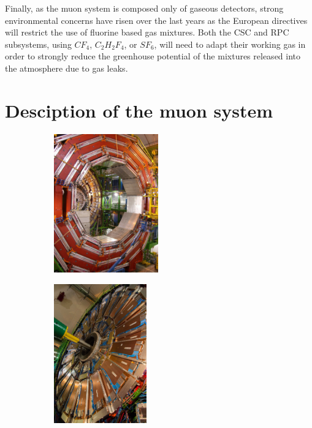 	Finally, as the muon system is composed only of gaseous detectors, strong environmental concerns have risen over the last years as the European directives will restrict the use of fluorine based gas mixtures. Both the CSC and RPC subsystems, using $CF_4$, $C_2H_2F_4$, or $SF_6$, will need to adapt their working gas in order to strongly reduce the greenhouse potential of the mixtures released into the atmosphere due to gas leaks.
	
\endgroup
	
\section{Desciption of the muon system}
\label{chapt3:sec:muonsystem}
	
	\begin{figure}[H]
		\begin{subfigure}{0.35\linewidth}
			\centering
			\includegraphics[height = 6cm]{fig/chapt3/Wheel.jpg}
			\caption{\label{fig:Muon:A}}
		\end{subfigure}
		\begin{subfigure}{0.3\linewidth}
			\centering
			\includegraphics[height = 6cm]{fig/chapt3/Disk_CSC.jpg}
			\caption{\label{fig:Muon:B}}
		\end{subfigure}
		\begin{subfigure}{0.35\linewidth}
			\centering

\end{subfigure}
\end{figure}
